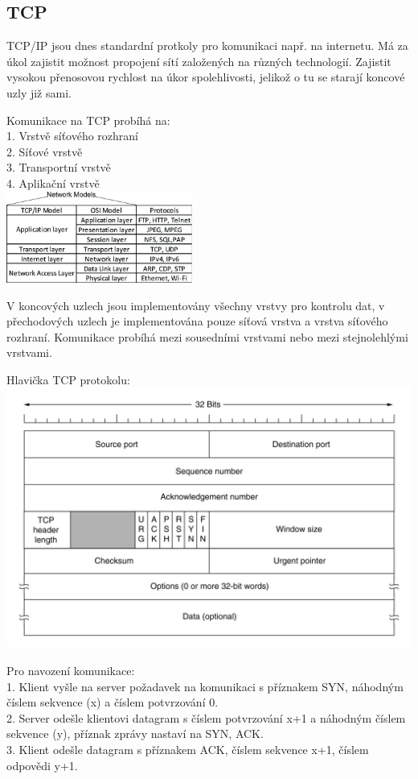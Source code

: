 \subsection{TCP}
TCP/IP jsou dnes standardní protkoly pro komunikaci např. na internetu.
Má za úkol zajistit možnost propojení sítí založených na různých technologií.
Zajistit vysokou přenosovou rychlost na úkor spolehlivosti, jelikož o tu se starají koncové uzly již sami.
\begin{multicols}{2}
  Komunikace na TCP probíhá na: \\
  1. Vrstvě síťového rozhraní   \\
  2. Síťové vrstvě              \\
  3. Transportní vrstvě         \\
  4. Aplikační vrstvě           \\
  \columnbreak
  \includegraphics[height=3cm]{TVY-POS/ISO-OSI-TCP-IP/tcpip.jpg}
\end{multicols}
V koncových uzlech jsou implementovány všechny vrstvy pro kontrolu dat, v přechodových uzlech je implementována pouze síťová vrstva a vrstva síťového rozhraní.
Komunikace probíhá mezi sousedními vrstvami nebo mezi stejnolehlými vrstvami.
\begin{multicols}{2}
  Hlavička TCP protokolu:   \\
  \includegraphics[width=\linewidth]{TVY-POS/ISO-OSI-TCP-IP/TCPheader.jpg}

  \columnbreak
  Pro navození komunikace:  \\
  1. Klient vyšle na server požadavek na komunikaci s příznakem SYN, náhodným číslem sekvence (x) a číslem potvrzování 0.           \\
  2. Server odešle klientovi datagram s číslem potvrzování x+1 a náhodným číslem sekvence (y), příznak zprávy nastaví na SYN, ACK.  \\
  3. Klient odešle datagram s příznakem ACK, číslem sekvence x+1, číslem odpovědi y+1.
\end{multicols}
